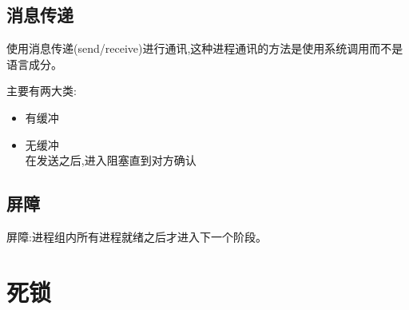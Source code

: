 \documentclass[UTF8,a4paper]{ctexart}
\begin{document}
\subsection{消息传递}
使用消息传递(send/receive)进行通讯,这种进程通讯的方法是使用系统调用而不是语言成分。

主要有两大类:
\begin{itemize}
	\item 有缓冲
	\item 无缓冲\\
	      在发送之后,进入阻塞直到对方确认
\end{itemize}

\subsection{屏障}
屏障:进程组内所有进程就绪之后才进入下一个阶段。

%
%
%
%
%
%
%
%

\section{死锁}
\end{document}
